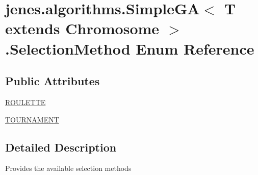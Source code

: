 \hypertarget{enumjenes_1_1algorithms_1_1_simple_g_a_3_01_t_01extends_01_chromosome_01_4_1_1_selection_method}{\section{jenes.\-algorithms.\-Simple\-G\-A$<$ T extends Chromosome $>$.Selection\-Method Enum Reference}
\label{enumjenes_1_1algorithms_1_1_simple_g_a_3_01_t_01extends_01_chromosome_01_4_1_1_selection_method}
}
\subsection*{Public Attributes}
\begin{DoxyCompactItemize}
\item 
\hyperlink{enumjenes_1_1algorithms_1_1_simple_g_a_3_01_t_01extends_01_chromosome_01_4_1_1_selection_method_aaa9788ea9a69bb07b709bb79c185e850}{R\-O\-U\-L\-E\-T\-T\-E}
\item 
\hyperlink{enumjenes_1_1algorithms_1_1_simple_g_a_3_01_t_01extends_01_chromosome_01_4_1_1_selection_method_aa82c1a99611b7bd81e72f0f8429606cd}{T\-O\-U\-R\-N\-A\-M\-E\-N\-T}
\end{DoxyCompactItemize}


\subsection{Detailed Description}
Provides the available selection methods 


